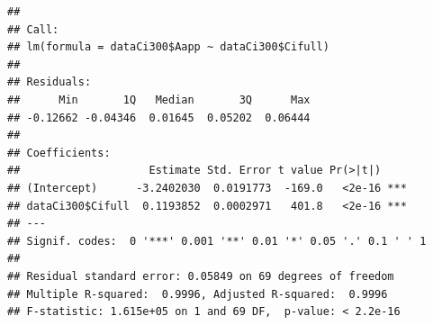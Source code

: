 \documentclass[
]{krantz}
\makeatletter
\newenvironment{Shaded}{\begin{snugshade}}{\end{snugshade}}
\newcommand{\CommentTok}[1]{\textcolor[rgb]{0.56,0.35,0.01}{\textit{#1}}}
\newcommand{\DecValTok}[1]{\textcolor[rgb]{0.00,0.00,0.81}{#1}}
\newcommand{\FunctionTok}[1]{\textcolor[rgb]{0.00,0.00,0.00}{#1}}
\newcommand{\NormalTok}[1]{#1}
\newcommand{\OtherTok}[1]{\textcolor[rgb]{0.56,0.35,0.01}{#1}}
\newcommand{\SpecialCharTok}[1]{\textcolor[rgb]{0.00,0.00,0.00}{#1}}
\newcommand{\StringTok}[1]{\textcolor[rgb]{0.31,0.60,0.02}{#1}}
\newenvironment{kframe}{%
\medskip{}
\setlength{\fboxsep}{.8em}
 \def\at@end@of@kframe{}%
 \ifinner\ifhmode%
  \def\at@end@of@kframe{\end{minipage}}%
  \begin{minipage}{\columnwidth}%
 \fi\fi%
 \def\FrameCommand##1{\hskip\@totalleftmargin \hskip-\fboxsep
 \colorbox{shadecolor}{##1}\hskip-\fboxsep
     \hskip-\linewidth \hskip-\@totalleftmargin \hskip\columnwidth}%
 \MakeFramed {\advance\hsize-\width
   \@totalleftmargin\z@ \linewidth\hsize
   \@setminipage}}%
 {\par\unskip\endMakeFramed%
 \at@end@of@kframe}
\renewenvironment{Shaded}{\begin{kframe}}{\end{kframe}}
\makeatother
\begin{document}
\begin{verbatim}
## 
## Call:
## lm(formula = dataCi300$Aapp ~ dataCi300$Cifull)
## 
## Residuals:
##      Min       1Q   Median       3Q      Max 
## -0.12662 -0.04346  0.01645  0.05202  0.06444 
## 
## Coefficients:
##                    Estimate Std. Error t value Pr(>|t|)    
## (Intercept)      -3.2402030  0.0191773  -169.0   <2e-16 ***
## dataCi300$Cifull  0.1193852  0.0002971   401.8   <2e-16 ***
## ---
## Signif. codes:  0 '***' 0.001 '**' 0.01 '*' 0.05 '.' 0.1 ' ' 1
## 
## Residual standard error: 0.05849 on 69 degrees of freedom
## Multiple R-squared:  0.9996, Adjusted R-squared:  0.9996 
## F-statistic: 1.615e+05 on 1 and 69 DF,  p-value: < 2.2e-16
\end{verbatim}

\begin{Shaded}
\end{Shaded}
\end{document}
